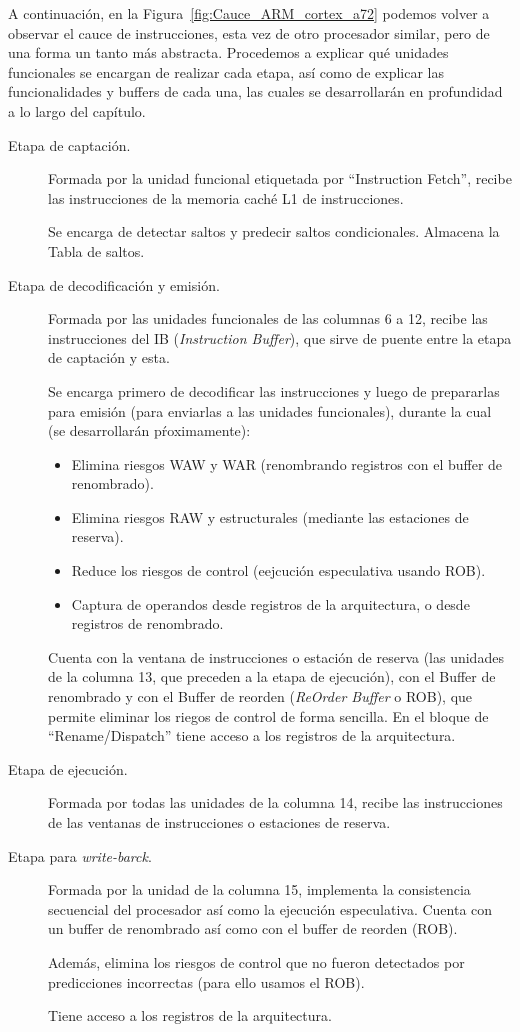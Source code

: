 A continuación, en la Figura~\ref{fig:Cauce_ARM_cortex_a72} podemos volver a observar el cauce de instrucciones, esta vez de otro procesador similar, pero de una forma un tanto más abstracta. Procedemos a explicar qué unidades funcionales se encargan de realizar cada etapa, así como de explicar las funcionalidades y buffers de cada una, las cuales se desarrollarán en profundidad a lo largo del capítulo.

\begin{description}
    \item [Etapa de captación.] Formada por la unidad funcional etiquetada por ``Instruction Fetch'', recibe las instrucciones de la memoria caché L1 de instrucciones.

        Se encarga de detectar saltos y predecir saltos condicionales. Almacena la Tabla de saltos.
    \item [Etapa de decodificación y emisión.] Formada por las unidades funcionales de las columnas 6 a 12, recibe las instrucciones del IB (\emph{Instruction Buffer}), que sirve de puente entre la etapa de captación y esta.

        Se encarga primero de decodificar las instrucciones y luego de prepararlas para emisión (para enviarlas a las unidades funcionales), durante la cual (se desarrollarán pŕoximamente):
        \begin{itemize}
            \item Elimina riesgos WAW y WAR (renombrando registros con el buffer de renombrado).
            \item Elimina riesgos RAW y estructurales (mediante las estaciones de reserva).
            \item Reduce los riesgos de control (eejcución especulativa usando ROB).
            \item Captura de operandos desde registros de la arquitectura, o desde registros de renombrado.
        \end{itemize}
        Cuenta con la ventana de instrucciones o estación de reserva (las unidades de la columna 13, que preceden a la etapa de ejecución), con el Buffer de renombrado y con el Buffer de reorden (\emph{ReOrder Buffer} o ROB), que permite eliminar los riegos de control de forma sencilla. En el bloque de ``Rename/Dispatch'' tiene acceso a los registros de la arquitectura.
    \item [Etapa de ejecución.] Formada por todas las unidades de la columna 14, recibe las instrucciones de las ventanas de instrucciones o estaciones de reserva.
    \item [Etapa para \emph{write-barck}.] Formada por la unidad de la columna 15, implementa la consistencia secuencial del procesador así como la ejecución especulativa. Cuenta con un buffer de renombrado así como con el buffer de reorden (ROB).

        Además, elimina los riesgos de control que no fueron detectados por predicciones incorrectas (para ello usamos el ROB).

        Tiene acceso a los registros de la arquitectura.
\end{description}

